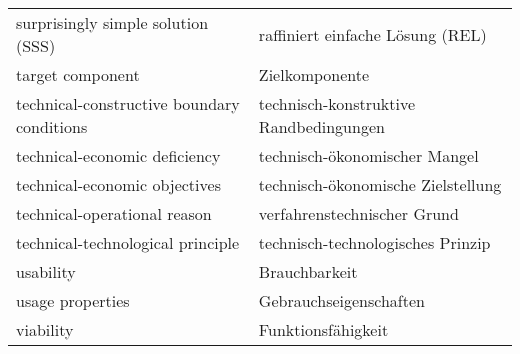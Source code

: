 \documentclass[11pt,a4paper]{article}
\begin{document}
\begin{center}
\begin{tabular}{l|l}
    surprisingly simple solution (SSS) & raffiniert einfache Lösung (REL)\\
    target component & Zielkomponente\\
    technical-constructive boundary conditions & technisch-konstruktive
    Randbedingungen \\
    technical-economic deficiency & technisch-ökonomischer Mangel\\
    technical-economic objectives & technisch-ökonomische Zielstellung\\
    technical-operational reason & verfahrenstechnischer Grund \\
    technical-technological principle & technisch-technologisches Prinzip\\
    usability & Brauchbarkeit \\
    usage properties & Gebrauchseigenschaften \\
    viability & Funktionsfähigkeit \\
  \end{tabular}
\end{center}
\end{document}
